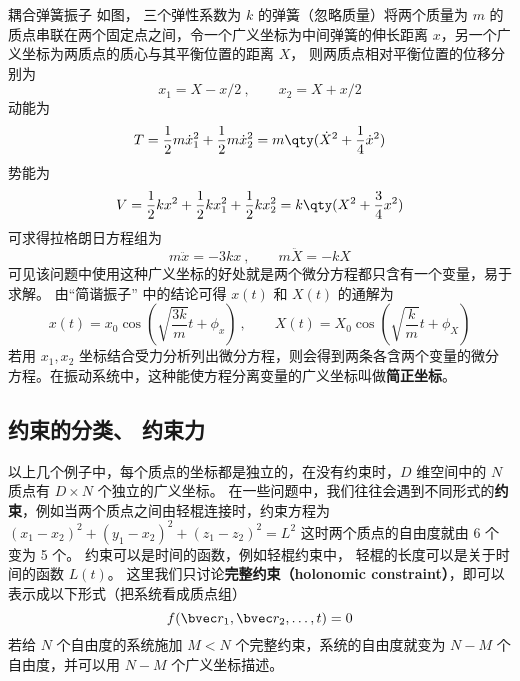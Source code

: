 \begin{example}{耦合弹簧振子}\label{Lagrng_ex2}
如图， 三个弹性系数为 $k$ 的弹簧（忽略质量）将两个质量为 $m$ 的质点串联在两个固定点之间，令一个广义坐标为中间弹簧的伸长距离 $x$，另一个广义坐标为两质点的质心与其平衡位置的距离 $X$， 则两质点相对平衡位置的位移分别为
\begin{equation}
x_1=X-x/2~, \qquad x_2 = X+x/2
\end{equation}
动能为
\begin{equation}
T=\frac12 m\dot x_1^2 + \frac12 m\dot x_2^2 = m \qty(\dot X^2 + \frac14 \dot x^2)
\end{equation}
势能为
\begin{equation}
V = \frac12 k x^2 + \frac12 kx_1^2 + \frac12 k x_2^2 = k\qty(X^2 + \frac34 x^2)
\end{equation}
可求得拉格朗日方程组为
\begin{equation}
m\ddot x =  - 3kx~, \qquad m\ddot X =  - kX
\end{equation}
可见该问题中使用这种广义坐标的好处就是两个微分方程都只含有一个变量，易于求解。 由“简谐振子” 中的结论可得 $x(t)$ 和 $X(t)$ 的通解为
\begin{equation}
x(t) = x_0 \cos(\sqrt{\frac{3k}{m}} t + \phi_x)~,
\qquad
X(t) = X_0 \cos(\sqrt{\frac{k}{m}} t + \phi_X)
\end{equation}
若用 $x_1, x_2$ 坐标结合受力分析列出微分方程，则会得到两条各含两个变量的微分方程。在振动系统中，这种能使方程分离变量的广义坐标叫做\textbf{简正坐标}。%
\end{example}

\subsection{约束的分类、 约束力}

以上几个例子中，每个质点的坐标都是独立的，在没有约束时，$D$ 维空间中的 $N$ 质点有 $D\times N$ 个独立的广义坐标。 在一些问题中，我们往往会遇到不同形式的\textbf{约束}，例如当两个质点之间由轻棍连接时，约束方程为 $(x_1-x_2)^2+(y_1-x_2)^2+(z_1-z_2)^2=L^2$ 这时两个质点的自由度就由 6 个变为 5 个。 约束可以是时间的函数，例如轻棍约束中， 轻棍的长度可以是关于时间的函数 $L(t)$。 这里我们只讨论\textbf{完整约束（holonomic constraint）}，即可以表示成以下形式（把系统看成质点组）
\begin{equation}\label{Lagrng_eq3}
f(\bvec r_1,\bvec r_2,\dots,t) = 0
\end{equation}
若给 $N$ 个自由度的系统施加 $M<N$ 个完整约束，系统的自由度就变为 $N-M$ 个自由度，并可以用 $N-M$ 个广义坐标描述。

